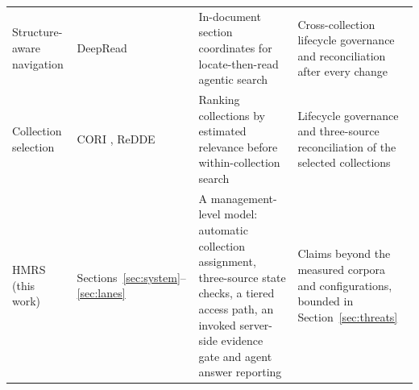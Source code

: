 \begin{table}[t]
\begin{tabular}{@{}>{\raggedright\arraybackslash}p{}>{\raggedright\arraybackslash}p{}>{\raggedright\arraybackslash}p{}>{\raggedright\arraybackslash}p{}@{}}
Structure-aware navigation & DeepRead \citep{deepread} & In-document section coordinates for locate-then-read agentic search & Cross-collection lifecycle governance and reconciliation after every change\\
Collection selection & CORI \citep{callan1995searching}, ReDDE \citep{si2003redde} & Ranking collections by estimated relevance before within-collection search & Lifecycle governance and three-source reconciliation of the selected collections\\
\midrule
HMRS (this work) & Sections~\ref{sec:system}--\ref{sec:lanes} & A management-level model: automatic collection assignment, three-source state checks, a tiered access path, an invoked server-side evidence gate and agent answer reporting & Claims beyond the measured corpora and configurations, bounded in Section~\ref{sec:threats}\\
\bottomrule
\end{tabular}
\end{table}

